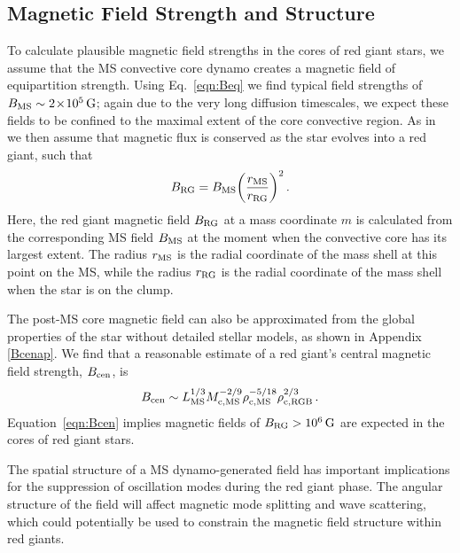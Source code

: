 \subsection{Magnetic Field Strength and Structure}
\label{fieldstruc}

To calculate plausible magnetic field strengths in the cores of red giant stars, we assume that the MS convective core dynamo creates a magnetic field of equipartition strength.
Using Eq.~\ref{eqn:Beq} we find typical field strengths of $B_{\rm MS} \sim 2 \! \times \! 10^5 \, {\rm G}$; again due to the very long diffusion timescales, we expect these fields to be confined to the maximal extent of the core convective region. As in \citet{Fuller_2015} we then assume that magnetic flux is conserved as the star evolves into a red giant, such that
\begin{equation}
\label{eqn:Brgb}
B_{\rm RG} = B_{\rm MS} \bigg( \frac{r_{\rm MS}}{r_{\rm RG}} \bigg)^2 \, .
\end{equation}
Here, the red giant magnetic field $B_{\rm RG}$ at a mass coordinate $m$ is calculated from the corresponding MS field $B_{\rm MS}$ at the moment when the convective core has its largest extent. The radius $r_{\rm MS}$ is the radial coordinate of the mass shell at this point on the MS, while the radius $r_{\rm RG}$ is the radial coordinate of the mass shell when the star is on the clump. 

The post-MS core magnetic field can also be approximated from the global properties of the star without detailed stellar models, as shown in Appendix \ref{Bcenap}. We find that a reasonable estimate of a red giant's central magnetic field strength, $B_{\rm cen}$, is
\begin{equation}
\label{eqn:Bcen}
B_{\rm cen} \sim L_{\rm MS}^{1/3} M_{\rm c,MS}^{-2/9} \rho_{\rm c,MS}^{-5/18} \rho_{\rm c,RGB}^{2/3} \, .
\end{equation}
Equation~\ref{eqn:Bcen} implies magnetic fields of $B_{\rm RG} > 10^6 \, {\rm G}$ are expected in the cores of red giant stars.

The spatial structure of a MS dynamo-generated field has important implications for the suppression of oscillation modes during the red giant phase.
The angular structure of the field will affect magnetic mode splitting and wave scattering, which could potentially be used to constrain the magnetic field structure within red giants.

